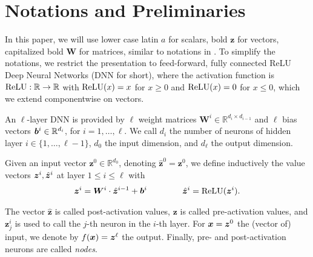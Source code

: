 \section{Notations and Preliminaries}
	
	In this paper, we will use lower case latin $a$ for scalars, bold $\boldsymbol{z}$ for vectors, 
	capitalized bold $\boldsymbol{W}$ for matrices, similar to notations in \cite{crown}.
	To simplify the notations, we restrict the presentation to feed-forward, 
	fully connected ReLU Deep Neural Networks (DNN for short), where the activation function is $\mathrm{ReLU} : \mathbb{R} \rightarrow \mathbb{R}$ with
	$\mathrm{ReLU}(x)=x$ for $x \geq 0$ and $\mathrm{ReLU}(x)=0$ for $x \leq 0$, which we extend componentwise on vectors.
	
	
	
	
	An $\ell$-layer DNN is provided by $\ell$ weight matrices 
	$\boldsymbol{W}^i \in \mathbb{R}^{d_i\times d_{i-1}}$
	and $\ell$ bias vectors ${\bm{b}}^i \in \mathbb{R}^{d_i}$, for $i=1, \ldots, \ell$.
	We call $d_i$ the number of neurons of hidden layer 
	$i \in \{1, \ldots, \ell-1\}$,
	$d_0$ the input dimension, and $d_\ell$ the output dimension.
	
	Given an input vector $\boldsymbol{z}^0 \in \mathbb{R}^{d_0}$, 
	denoting $\hat{\boldsymbol{z}}^{0}={\boldsymbol{z}}^0$, we define inductively the value vectors $\boldsymbol{z}^i,\hat{{\bm{z}}}^i$ at layer $1 \leq i \leq \ell$ with
	\begin{align*}
		\boldsymbol{z}^{i} = \boldsymbol{W}^i\cdot \hat{\boldsymbol{z}}^{i-1}+ {\bm{b}}^i \qquad \, \qquad
		\hat{\boldsymbol{z}}^{i} = \mathrm{ReLU}({\boldsymbol{z}}^i).
	\end{align*} 
	
	The vector $\hat{\boldsymbol{z}}$ is called post-activation values, 
	$\boldsymbol{z}$ is called pre-activation values, 
	and $\boldsymbol{z}^{i}_j$ is used to call the $j$-th neuron in the $i$-th layer. 
	For $\boldsymbol{x}={\bm{z}}^0$ the (vector of) input, we denote by $f(\boldsymbol{x})={\bm{z}}^\ell$ the output. Finally, pre- and post-activation neurons are called \emph{nodes}.
	
